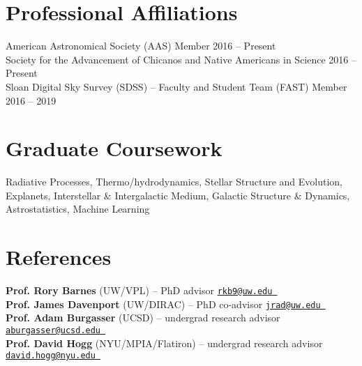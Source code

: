\documentclass[a4,10.5pt]{article}
\let\orighref\href
\renewcommand{\href}[2]{\orighref{#1}{#2\,\scriptsize\faExternalLink}}
\begin{document}
\section{Professional Affiliations}

American Astronomical Society (AAS) Member \hfill 2016 -- Present \\
Society for the Advancement of Chicanos and Native Americans in Science \hfill 2016 -- Present \\
Sloan Digital Sky Survey (SDSS) -- Faculty and Student Team (FAST) Member \hfill 2016 -- 2019 

\section{Graduate Coursework}

Radiative Processes, Thermo/hydrodynamics, Stellar Structure and Evolution, Explanets, Interstellar \& Intergalactic Medium, Galactic Structure \& Dynamics, Astrostatistics, Machine Learning

\section{References}

\textbf{Prof. Rory Barnes} (UW/VPL) -- PhD advisor \hfill {\tt \href{rkb9@uw.edu}{rkb9@uw.edu}} \\
\textbf{Prof. James Davenport} (UW/DIRAC) -- PhD co-advisor \hfill {\tt \href{jrad@uw.edu}{jrad@uw.edu}} \\
\textbf{Prof. Adam Burgasser} (UCSD) -- undergrad research advisor \hfill {\tt \href{aburgasser@ucsd.edu}{aburgasser@ucsd.edu}}   \\
\textbf{Prof. David Hogg} (NYU/MPIA/Flatiron) -- undergrad research advisor \hfill {\tt \href{david.hogg@nyu.edu}{david.hogg@nyu.edu}}  \\

\end{document}
